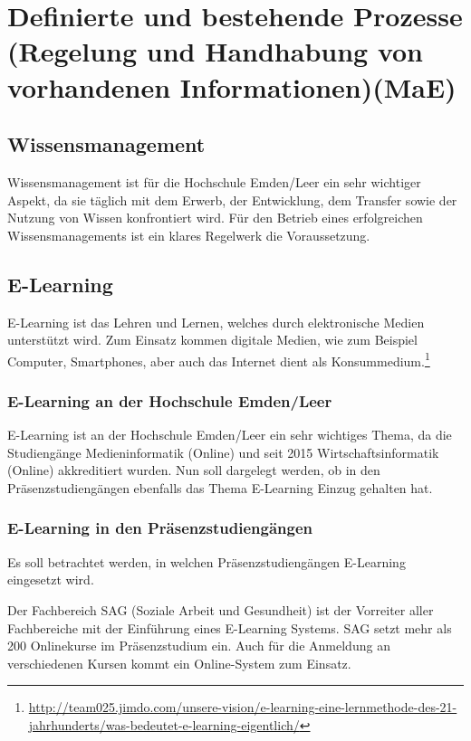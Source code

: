 \section{Definierte und bestehende Prozesse (Regelung und Handhabung von vorhandenen Informationen)(MaE)}

\subsection{Wissensmanagement}
Wissensmanagement ist für die Hochschule Emden/Leer ein sehr wichtiger Aspekt, da sie täglich mit dem Erwerb, der Entwicklung, dem Transfer sowie der Nutzung von Wissen konfrontiert wird. Für den Betrieb eines erfolgreichen Wissensmanagements ist ein klares Regelwerk die Voraussetzung.

\subsection{E-Learning}
E-Learning ist das Lehren und Lernen, welches durch elektronische Medien unterstützt wird. 
Zum Einsatz kommen digitale Medien, wie zum Beispiel Computer, Smartphones, aber auch 
das Internet dient als Konsummedium.\footnote{\url{http://team025.jimdo.com/unsere-vision/e-learning-eine-lernmethode-des-21-jahrhunderts/was-bedeutet-e-learning-eigentlich/}}

\subsubsection{E-Learning an der Hochschule Emden/Leer}
E-Learning ist an der Hochschule Emden/Leer ein sehr wichtiges Thema, da die Studiengänge Medieninformatik (Online) und seit 2015 Wirtschaftsinformatik (Online) akkreditiert  wurden. Nun soll dargelegt werden, ob in den Präsenzstudiengängen ebenfalls das Thema E-Learning Einzug gehalten hat.

\subsubsection{E-Learning in den Präsenzstudiengängen}
Es soll betrachtet werden, in welchen Präsenzstudiengängen E-Learning eingesetzt wird.

Der Fachbereich SAG (Soziale Arbeit und Gesundheit) ist der Vorreiter aller Fachbereiche mit der Einführung eines E-Learning Systems. SAG setzt mehr als 200 Onlinekurse im Präsenzstudium ein. Auch für die Anmeldung an verschiedenen Kursen kommt ein Online-System zum Einsatz.

